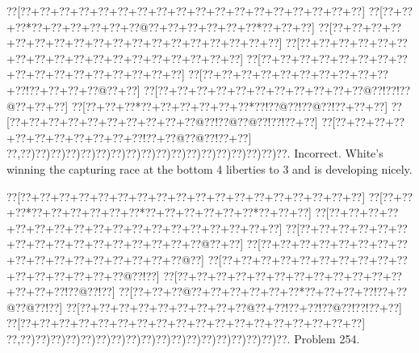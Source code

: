 \documentclass[a5paper]{article}
\begin{document}
\begin{center}
{\goo
\0??[\0??+\0??+\0??+\0??+\0??+\0??+\0??+\0??+\0??+\0??+\0??+\0??+\0??+\0??+\0??+\0??+\0??+\0??]
\0??[\0??+\0??+\0??*\0??+\0??+\0??+\0??+\0??+\0??@\0??+\0??+\0??+\0??+\0??+\0??*\0??+\0??+\0??]
\0??[\0??+\0??+\0??+\0??+\0??+\0??+\0??+\0??+\0??+\0??+\0??+\0??+\0??+\0??+\0??+\0??+\0??+\0??]
\0??[\0??+\0??+\0??+\0??+\0??+\0??+\0??+\0??+\0??+\0??+\0??+\0??+\0??+\0??+\0??+\0??+\0??+\0??]
\0??[\0??+\0??+\0??+\0??+\0??+\0??+\0??+\0??+\0??+\0??+\0??+\0??+\0??+\0??+\0??+\0??+\0??]
\0??[\0??+\0??+\0??+\0??+\0??+\0??+\0??+\0??+\0??+\0??+\0??!\0??+\0??+\0??+\0??@\0??+\0??]
\0??[\0??+\0??+\0??+\0??+\0??+\0??+\0??+\0??+\0??+\0??+\0??@\0??!\0??!\0??@\0??+\0??+\0??]
\0??[\0??+\0??+\0??*\0??+\0??+\0??+\0??+\0??+\0??*\0??!\0??@\0??!\0??@\0??!\0??+\0??+\0??]
\0??[\0??+\0??+\0??+\0??+\0??+\0??+\0??+\0??+\0??+\0??@\0??!\0??@\0??@\0??!\0??!\0??+\0??]
\0??[\0??+\0??+\0??+\0??+\0??+\0??+\0??+\0??+\0??+\0??+\0??!\0??+\0??@\0??@\0??!\0??+\0??]
\0??,\0??)\0??)\0??)\0??)\0??)\0??)\0??)\0??)\0??)\0??)\0??)\0??)\0??)\0??)\0??)\0??)\0??)\0??.
}
Incorrect. White's winning the capturing race at the bottom 4 liberties to 3 and is developing nicely.

\end{center}
\newpage
\begin{center}
{\goo
\0??[\0??+\0??+\0??+\0??+\0??+\0??+\0??+\0??+\0??+\0??+\0??+\0??+\0??+\0??+\0??+\0??+\0??+\0??]
\0??[\0??+\0??+\0??*\0??+\0??+\0??+\0??+\0??+\0??*\0??+\0??+\0??+\0??+\0??+\0??*\0??+\0??+\0??]
\0??[\0??+\0??+\0??+\0??+\0??+\0??+\0??+\0??+\0??+\0??+\0??+\0??+\0??+\0??+\0??+\0??+\0??+\0??]
\0??[\0??+\0??+\0??+\0??+\0??+\0??+\0??+\0??+\0??+\0??+\0??+\0??+\0??+\0??+\0??+\0??@\0??+\0??]
\0??[\0??+\0??+\0??+\0??+\0??+\0??+\0??+\0??+\0??+\0??+\0??+\0??+\0??+\0??+\0??+\0??+\0??@\0??]
\0??[\0??+\0??+\0??+\0??+\0??+\0??+\0??+\0??+\0??+\0??+\0??+\0??+\0??+\0??+\0??+\0??@\0??!\0??]
\0??[\0??+\0??+\0??+\0??+\0??+\0??+\0??+\0??+\0??+\0??+\0??+\0??+\0??+\0??+\0??!\0??@\0??!\0??]
\0??[\0??+\0??+\0??@\0??+\0??+\0??+\0??+\0??+\0??*\0??+\0??+\0??+\0??!\0??+\0??@\0??@\0??!\0??]
\0??[\0??+\0??+\0??+\0??+\0??+\0??+\0??+\0??+\0??@\0??+\0??!\0??+\0??!\0??@\0??!\0??!\0??+\0??]
\0??[\0??+\0??+\0??+\0??+\0??+\0??+\0??+\0??+\0??+\0??+\0??+\0??+\0??+\0??+\0??+\0??+\0??+\0??]
\0??,\0??)\0??)\0??)\0??)\0??)\0??)\0??)\0??)\0??)\0??)\0??)\0??)\0??)\0??)\0??)\0??)\0??)\0??.
}
Problem 254.

\end{center}
\end{document}
